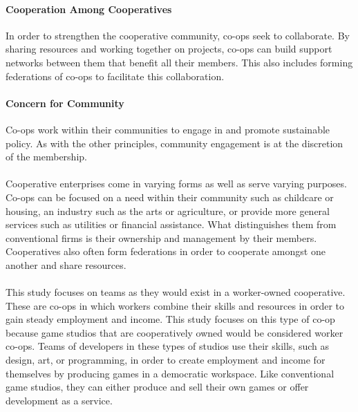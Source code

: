 \paragraph{Cooperation Among Cooperatives} In order to strengthen the cooperative community, co-ops seek to collaborate. By sharing resources and working together on projects, co-ops can build support networks between them that benefit all their members. This also includes forming federations of co-ops to facilitate this collaboration.

\paragraph{Concern for Community} Co-ops work within their communities to engage in and promote sustainable policy. As with the other principles, community engagement is at the discretion of the membership. 

\paragraph{} Cooperative enterprises come in varying forms as well as serve varying purposes. Co-ops can be focused on a need within their community such as childcare or housing, an industry such as the arts or agriculture, or provide more general services such as utilities or financial assistance. What distinguishes them from conventional firms is their ownership and management by their members. Cooperatives also often form federations in order to cooperate amongst one another and share resources. 

\paragraph{} This study focuses on teams as they would exist in a worker-owned cooperative. These are co-ops in which workers combine their skills and resources in order to gain steady employment and income. This study focuses on this type of co-op because game studios that are cooperatively owned would be considered worker co-ops. Teams of developers in these types of studios use their skills, such as design, art, or programming, in order to create employment and income for themselves by producing games in a democratic workspace. Like conventional game studios, they can either produce and sell their own games or offer development as a service.

